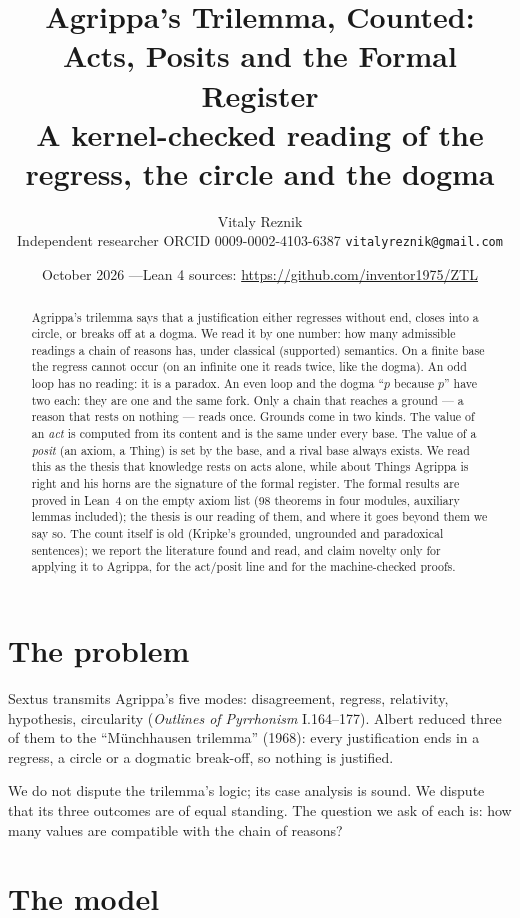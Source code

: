 \documentclass[11pt,a4paper]{article}
\title{\textbf{Agrippa's Trilemma, Counted:\\ Acts, Posits and the Formal Register}\\[6pt]
\large A kernel-checked reading of the regress, the circle and the dogma}
\author{Vitaly Reznik\\[2pt]
\small Independent researcher \quad ORCID 0009-0002-4103-6387 \quad \texttt{vitalyreznik@gmail.com}}
\date{\small October 2026 \quad---\quad Lean 4 sources: \url{https://github.com/inventor1975/ZTL}}
\begin{document}
\maketitle

\begin{abstract}
\noindent
Agrippa's trilemma says that a justification either regresses without end, closes into a circle, or breaks off at a
dogma. We read it by one number: how many admissible readings a chain of reasons has, under classical (supported)
semantics. On a finite base the regress cannot occur (on an infinite one it reads twice, like the dogma). An odd loop
has no reading: it is a paradox. An even loop and the dogma ``$p$ because $p$'' have two
each: they are one and the same fork. Only a chain that reaches a ground --- a reason that rests on nothing --- reads once. Grounds come in two kinds. The
value of an \emph{act} is computed from its content and is the same under every base. The value of a \emph{posit}
(an axiom, a Thing) is set by the base, and a rival base always exists. We read this as the thesis that knowledge rests on acts alone, while about Things Agrippa is right and his horns are
the signature of the formal register. The formal results are proved in Lean~4 on the empty axiom list (98 theorems in four modules, auxiliary lemmas included); the thesis is our reading of them, and where it goes beyond them we say so. The count itself is old (Kripke's grounded, ungrounded and paradoxical sentences); we report the literature
found and read, and claim novelty only for applying it to Agrippa, for the act/posit line and for the machine-checked
proofs.
\end{abstract}

\section{The problem}

Sextus transmits Agrippa's five modes: disagreement, regress, relativity, hypothesis, circularity (\emph{Outlines of
Pyrrhonism} I.164--177). Albert reduced three of them to the ``Münchhausen trilemma'' (1968): every justification ends
in a regress, a circle or a dogmatic break-off, so nothing is justified.

We do not dispute the trilemma's logic; its case analysis is sound. We dispute that its three outcomes are of equal
standing. The question we ask of each is: how many values are compatible with the chain of reasons?

\section{The model}
\end{document}
